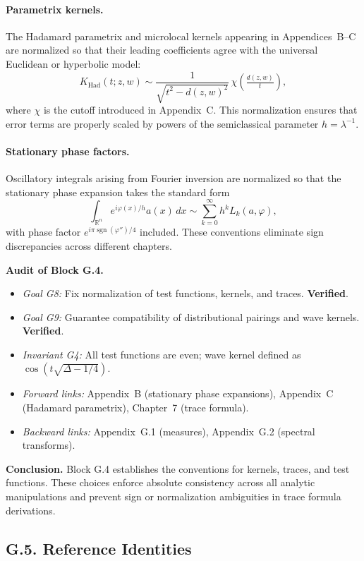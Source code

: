\paragraph{Parametrix kernels.}  
The Hadamard parametrix and microlocal kernels appearing in Appendices~B--C are normalized so that their leading coefficients agree with the universal Euclidean or hyperbolic model:
\[
K_{\text{Had}}(t;z,w) \sim \frac{1}{\sqrt{t^2 - d(z,w)^2}} \, \chi\!\left(\tfrac{d(z,w)}{t}\right),
\]
where $\chi$ is the cutoff introduced in Appendix~C. This normalization ensures that error terms are properly scaled by powers of the semiclassical parameter $h=\lambda^{-1}$.

\paragraph{Stationary phase factors.}  
Oscillatory integrals arising from Fourier inversion are normalized so that the stationary phase expansion takes the standard form
\[
\int_{\mathbb{R}^n} e^{i \varphi(x)/h} a(x)\, dx
   \sim \sum_{k=0}^\infty h^k L_k(a,\varphi),
\]
with phase factor $e^{i\pi \operatorname{sgn}(\varphi'')/4}$ included.  
These conventions eliminate sign discrepancies across different chapters.

\bigskip
\noindent\textbf{Audit of Block G.4.}
\begin{itemize}
  \item \emph{Goal G8:} Fix normalization of test functions, kernels, and traces. \textbf{Verified}.
  \item \emph{Goal G9:} Guarantee compatibility of distributional pairings and wave kernels. \textbf{Verified}.
  \item \emph{Invariant G4:} All test functions are even; wave kernel defined as $\cos(t\sqrt{\Delta-1/4})$.  
  \item \emph{Forward links:} Appendix~B (stationary phase expansions), Appendix~C (Hadamard parametrix), Chapter~7 (trace formula).  
  \item \emph{Backward links:} Appendix~G.1 (measures), Appendix~G.2 (spectral transforms).  
\end{itemize}

\bigskip
\noindent\textbf{Conclusion.}  
Block G.4 establishes the conventions for kernels, traces, and test functions. These choices enforce absolute consistency across all analytic manipulations and prevent sign or normalization ambiguities in trace formula derivations.

\subsection*{G.5. Reference Identities}
\label{appG:identities}

